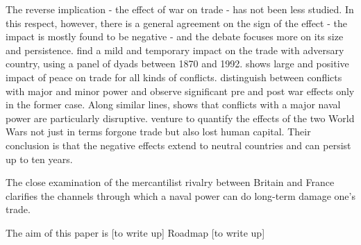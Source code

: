 \documentclass[12pt,a4paper,notitlepage,english]{article}
\begin{document}

The reverse implication - the effect of war on trade - has not been less studied.  
In this respect, however, there is a general agreement on the sign of the effect - the impact is mostly found to be negative - and the debate focuses more on its size and persistence.  
\cite{Levy2004} find a mild and temporary impact on the trade with adversary country, using a panel of dyads between 1870 and 1992.
\cite{blomberg2006much} shows large and positive impact of peace on trade for all kinds of conflicts. 
\cite{Anderton2001} distinguish between conflicts with major and minor power and observe significant pre and post war effects only in the former case. Along similar lines, \cite{Rahman2010} shows that conflicts with a major naval power are particularly disruptive. 
\cite{Glick2010} venture to quantify the effects of the two World Wars not just in terms forgone trade but also lost human capital. Their conclusion is that the negative effects extend to neutral countries and can persist up to ten years.  


The close examination of the mercantilist rivalry between Britain and France clarifies the channels through which a naval power can do long-term damage one's trade.

The aim of this paper is [to write up]
Roadmap [to write up]

\end{document}
